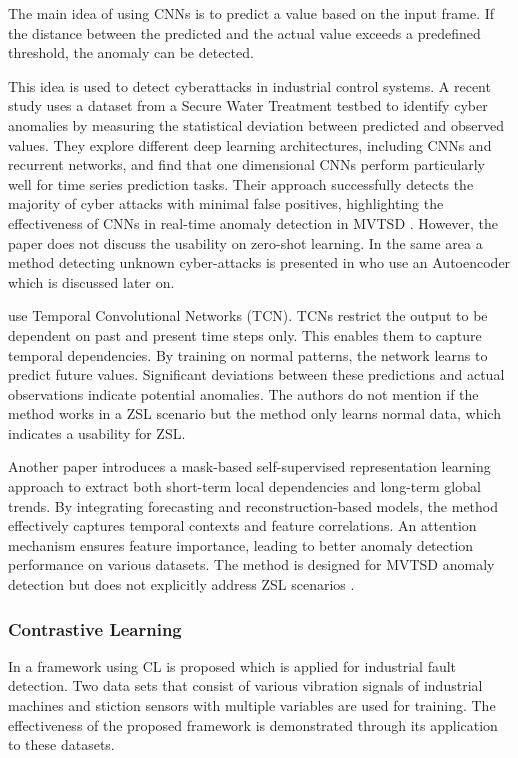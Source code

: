 The main idea of using CNNs is to predict a value based on the input frame. If the distance between the predicted and the actual value exceeds a predefined threshold, the anomaly can be detected.

This idea is used to detect cyberattacks in industrial control systems. A recent study uses a dataset from a Secure Water Treatment testbed to identify cyber anomalies by measuring the statistical deviation between predicted and observed values. They explore different deep learning architectures, including CNNs and recurrent networks, and find that one dimensional CNNs perform particularly well for time series prediction tasks. Their approach successfully detects the majority of cyber attacks with minimal false positives, highlighting the effectiveness of CNNs in real-time anomaly detection in MVTSD \cite{kravchik_detecting_2018}. However, the paper does not discuss the usability on zero-shot learning. In the same area a method detecting unknown cyber-attacks is presented in \cite{zhang_unknown_2020} who use an Autoencoder which is discussed later on.

\cite{he_temporal_2019} use Temporal Convolutional Networks (TCN). TCNs restrict the output to be dependent on past and present time steps only. This enables them to capture temporal dependencies. By training on normal patterns, the network learns to predict future values. Significant deviations between these predictions and actual observations indicate potential anomalies. The authors do not mention if the method works in a ZSL scenario but the method only learns normal data, which indicates a usability for ZSL.

Another paper introduces a mask-based self-supervised representation learning approach to extract both short-term local dependencies and long-term global trends. By integrating forecasting and reconstruction-based models, the method effectively captures temporal contexts and feature correlations. An attention mechanism ensures feature importance, leading to better anomaly detection performance on various datasets. The method is designed for MVTSD anomaly detection but does not explicitly address ZSL scenarios \cite{miao_unsupervised_2022}.

\subsubsection{Contrastive Learning}
In \cite{zhang_debiased_2024} a framework using CL is proposed which is applied for industrial fault detection. Two data sets that consist of various vibration signals of industrial machines and stiction sensors with multiple variables are used for training. The effectiveness of the proposed framework is demonstrated through its application to these datasets.

